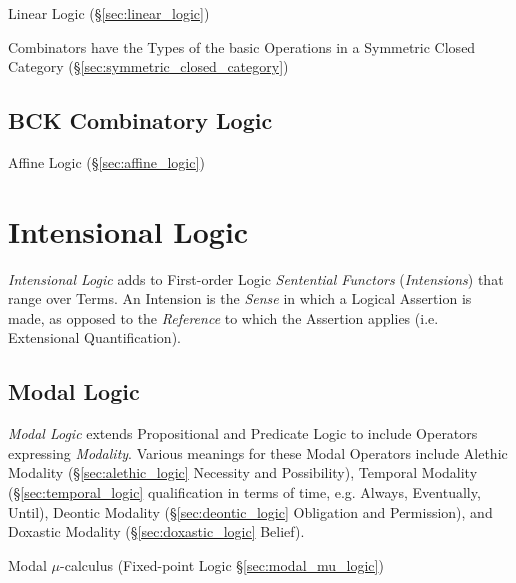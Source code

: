Linear Logic (\S\ref{sec:linear_logic})

Combinators have the Types of the basic Operations in a Symmetric Closed
Category (\S\ref{sec:symmetric_closed_category})



\subsection{BCK Combinatory Logic}\label{sec:bck_logic}

Affine Logic (\S\ref{sec:affine_logic})



\section{Intensional Logic}\label{sec:intensional_logic}

\emph{Intensional Logic} adds to First-order Logic \emph{Sentential
  Functors} (\emph{Intensions}) that range over Terms. An Intension is
the \emph{Sense} in which a Logical Assertion is made, as opposed to
the \emph{Reference} to which the Assertion applies (i.e. Extensional
Quantification).



\subsection{Modal Logic}\label{sec:modal_logic}

\emph{Modal Logic} extends Propositional and Predicate Logic to
include Operators expressing \emph{Modality}. Various meanings for
these Modal Operators include Alethic Modality
(\S\ref{sec:alethic_logic} Necessity and Possibility), Temporal
Modality (\S\ref{sec:temporal_logic} qualification in terms of time,
e.g. Always, Eventually, Until), Deontic Modality
(\S\ref{sec:deontic_logic} Obligation and Permission), and Doxastic
Modality (\S\ref{sec:doxastic_logic} Belief).

\fist Modal $\mu$-calculus (Fixed-point Logic \S\ref{sec:modal_mu_logic})

